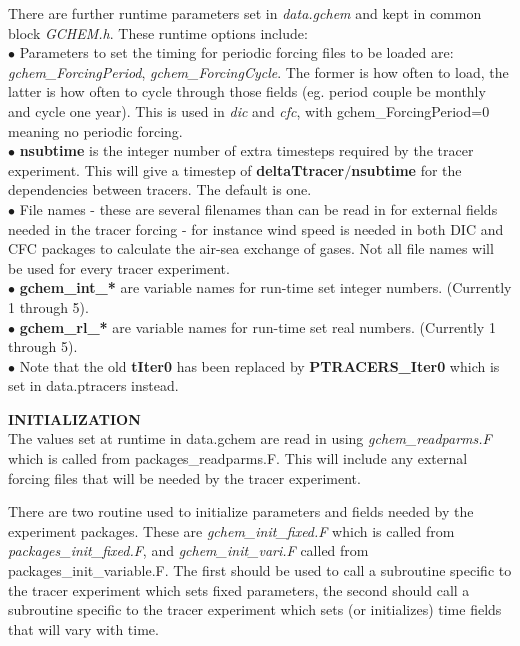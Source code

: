  There are further runtime parameters
set in {\it data.gchem} and kept in common block {\it GCHEM.h}.
These runtime options include:\\
$\bullet$ Parameters to set the timing for periodic forcing files to
be loaded are: {\it gchem\_ForcingPeriod}, {\it gchem\_ForcingCycle}.
The former is how often to load, the latter is how often to cycle
through those fields (eg. period couple be monthly and cycle one year).
This is used in {\it dic} and {\it cfc}, with gchem\_ForcingPeriod=0
meaning no periodic forcing.
\\
$\bullet$ {\bf nsubtime} is the integer number of extra timesteps
 required by the tracer experiment. This will give a timestep
 of {\bf deltaTtracer}$/${\bf nsubtime} for the dependencies
 between tracers. The default is one.
\\
$\bullet$ File names - these are several filenames than can be read in
 for external fields needed in the tracer forcing - for instance
 wind speed is needed in both DIC and CFC packages to calculate
 the air-sea exchange of gases. Not all file names will be used 
 for every tracer experiment. 
\\
$\bullet$ {\bf gchem\_int\_*} are variable names for run-time set integer numbers. (Currently 1 through 5).
\\
$\bullet$ {\bf gchem\_rl\_*} are variable names for run-time set real numbers. (Currently 1 through 5).
\\
$\bullet$ Note that the old {\bf tIter0} has been replaced by {\bf PTRACERS\_Iter0} which is
set in data.ptracers instead.

\vspace{.5cm}

\noindent
{{\bf INITIALIZATION}}\\
The values set at runtime in data.gchem are read in
using {\it gchem\_readparms.F} which is called from
packages\_readparms.F. This will include any external
forcing files that will be needed by the tracer experiment.

There are two routine used to initialize parameters and fields
needed by the experiment packages. These are
{\it gchem\_init\_fixed.F} which is called from \textit{packages\_init\_fixed.F}, and
{\it gchem\_init\_vari.F} called from 
packages\_init\_variable.F. The first should
be used to call a subroutine specific to the tracer experiment
which sets fixed parameters, the second should call a subroutine
specific to the tracer experiment
which sets (or initializes) time fields that will vary with time.

